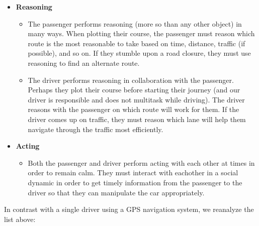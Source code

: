 \begin{itemize}
\begin{itemize}
  \end{itemize}
\item
  \textbf{Reasoning}
  \begin{itemize}
  \item
    The passenger performs reasoning (more so than any other object) in many ways. When plotting their course, the passenger must reason which route is the most reasonable to take based on time, distance, traffic (if possible), and so on. If they stumble upon a road closure, they must use reasoning to find an alternate route.
  \item
    The driver performs reasoning in collaboration with the passenger. Perhaps they plot their course before starting their journey (and our driver is responsible and does not multitask while driving). The driver reasons with the passenger on which route will work for them. If the driver comes up on traffic, they must reason which lane will help them navigate through the traffic most efficiently.
  \end{itemize}
\item
  \textbf{Acting}
  \begin{itemize}
  \item
    Both the passenger and driver perform acting with each other at times in order to remain calm. They must interact with eachother in a social dynamic in order to get timely information from the passenger to the driver so that they can manipulate the car appropriately.
  \end{itemize}
\end{itemize}

In contrast with a single driver using a GPS navigation system, we reanalyze the list above:

